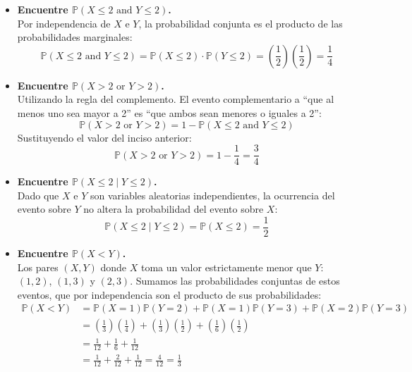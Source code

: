 \documentclass[10pt,a4paper]{book}
\begin{document}
\begin{itemize}
    \item[\textbf{a)}] \textbf{Encuentre $\mathbb{P}(X \le 2 \text{ and } Y \le 2)$.} \\
    Por independencia de $X$ e $Y$, la probabilidad conjunta es el producto de las probabilidades marginales:
    \[ \mathbb{P}(X \le 2 \text{ and } Y \le 2) = \mathbb{P}(X \le 2) \cdot \mathbb{P}(Y \le 2) = \left(\frac{1}{2}\right) \left(\frac{1}{2}\right) = \frac{1}{4} \]

    \item[\textbf{b)}] \textbf{Encuentre $\mathbb{P}(X > 2 \text{ or } Y > 2)$.} \\
    Utilizando la regla del complemento. El evento complementario a ``que al menos uno sea mayor a 2'' es ``que ambos sean menores o iguales a 2'':
    \[ \mathbb{P}(X > 2 \text{ or } Y > 2) = 1 - \mathbb{P}(X \le 2 \text{ and } Y \le 2) \]
    Sustituyendo el valor del inciso anterior:
    \[ \mathbb{P}(X > 2 \text{ or } Y > 2) = 1 - \frac{1}{4} = \frac{3}{4} \]

    \item[\textbf{c)}] \textbf{Encuentre $\mathbb{P}(X \le 2 \mid Y \le 2)$.} \\
    Dado que $X$ e $Y$ son variables aleatorias independientes, la ocurrencia del evento sobre $Y$ no altera la probabilidad del evento sobre $X$:
    \[ \mathbb{P}(X \le 2 \mid Y \le 2) = \mathbb{P}(X \le 2) = \frac{1}{2} \]

    \item[\textbf{d)}] \textbf{Encuentre $\mathbb{P}(X < Y)$.} \\
    Los pares $(X, Y)$ donde $X$ toma un valor estrictamente menor que $Y$: $(1, 2)$, $(1, 3)$ y $(2, 3)$. Sumamos las probabilidades conjuntas de estos eventos, que por independencia son el producto de sus probabilidades:
    \begin{align*}
        \mathbb{P}(X < Y) &= \mathbb{P}(X=1)\mathbb{P}(Y=2) + \mathbb{P}(X=1)\mathbb{P}(Y=3) + \mathbb{P}(X=2)\mathbb{P}(Y=3) \\
        &= \left(\frac{1}{3}\right)\left(\frac{1}{4}\right) + \left(\frac{1}{3}\right)\left(\frac{1}{2}\right) + \left(\frac{1}{6}\right)\left(\frac{1}{2}\right) \\
        &= \frac{1}{12} + \frac{1}{6} + \frac{1}{12} \\
        &= \frac{1}{12} + \frac{2}{12} + \frac{1}{12} = \frac{4}{12} = \frac{1}{3}
    \end{align*}
\end{itemize}
\end{document}
